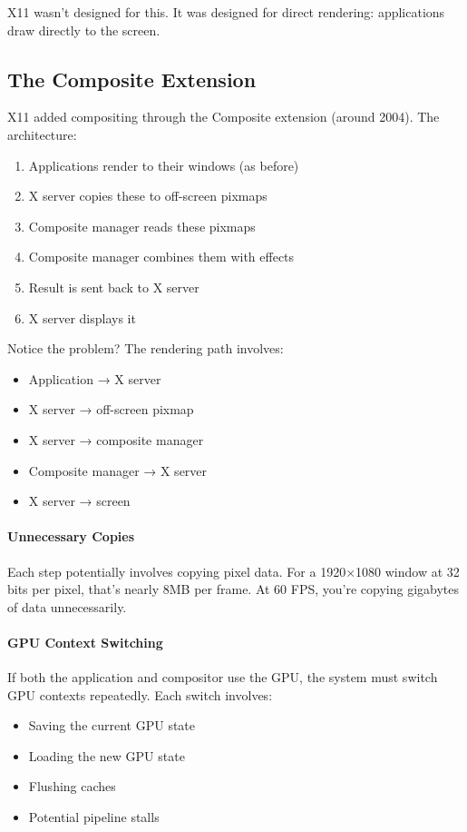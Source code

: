 X11 wasn't designed for this. It was designed for direct rendering: applications draw directly to the screen.

\subsection{The Composite Extension}

X11 added compositing through the Composite extension (around 2004). The architecture:

\begin{enumerate}
    \item Applications render to their windows (as before)
    \item X server copies these to off-screen pixmaps
    \item Composite manager reads these pixmaps
    \item Composite manager combines them with effects
    \item Result is sent back to X server
    \item X server displays it
\end{enumerate}

Notice the problem? The rendering path involves:
\begin{itemize}
    \item Application → X server
    \item X server → off-screen pixmap
    \item X server → composite manager
    \item Composite manager → X server
    \item X server → screen
\end{itemize}

\paragraph{Unnecessary Copies}
Each step potentially involves copying pixel data. For a 1920×1080 window at 32 bits per pixel, that's nearly 8MB per frame. At 60 FPS, you're copying gigabytes of data unnecessarily.

\paragraph{GPU Context Switching}
If both the application and compositor use the GPU, the system must switch GPU contexts repeatedly. Each switch involves:
\begin{itemize}
    \item Saving the current GPU state
    \item Loading the new GPU state
    \item Flushing caches
    \item Potential pipeline stalls
\end{itemize}

